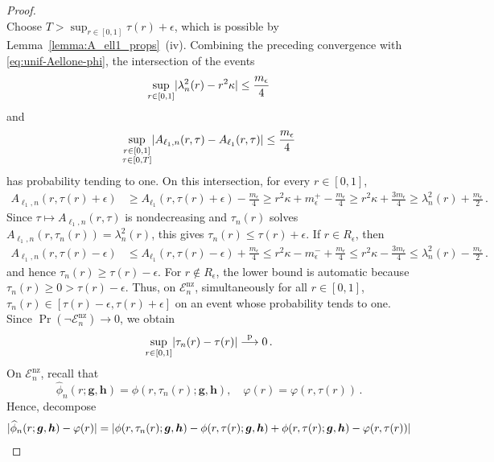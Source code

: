\documentclass{article}
\makeatletter
\theoremstyle{definition}
\newcommand{\abs}[1]{%
	\ensuremath{%
		\if@display
		\left| #1 \right|
		\else
		\lvert #1 \rvert
		\fi
	}%
}
\newcommand*{\bb}{\boldsymbol}
\def\bh{\bb{h}}
\def\bg{\bb{g}}
\makeatother
\begin{document}
\begin{bibunit}
\begin{proof}
$$$$
Choose $T>\sup_{r\in[0,1]}\tau(r)+\epsilon$, which is possible by
Lemma~\ref{lemma:A_ell1_props}~(iv). Combining the preceding convergence
with \eqref{eq:unif-Aellone-phi}, the intersection of the events
$$
\underset{r\in[0,1]}{\sup}
\abs{\lambda_n^2(r)-r^2\kappa}
\leq\frac{m_\epsilon}{4}
$$
and
$$
\underset{\substack{r\in[0,1]\\\tau\in[0,T]}}{\sup}
\abs{A_{\ell_1,n}(r,\tau)-A_{\ell_1}(r,\tau)}
\leq\frac{m_\epsilon}{4}
$$
has probability tending to one. On this intersection, for every
$r\in[0,1]$,
$$
\begin{aligned}
	    A_{\ell_1,n}(r,\tau(r)+\epsilon)
	    &\ge A_{\ell_1}(r,\tau(r)+\epsilon) - \frac{m_\epsilon}{4}
	    \ge r^2\kappa + m_\epsilon^+ - \frac{m_\epsilon}{4}
	    \ge r^2\kappa + \frac{3m_\epsilon}{4}
	    \ge \lambda_n^2(r) + \frac{m_\epsilon}{2} \,.
	\end{aligned}
	$$
	Since $\tau\mapsto A_{\ell_1,n}(r,\tau)$ is nondecreasing and
	$\tau_n(r)$ solves $A_{\ell_1,n}(r,\tau_n(r))=\lambda_n^2(r)$, this gives
	$\tau_n(r)\leq\tau(r)+\epsilon$.
If $r\in R_\epsilon$, then
$$
\begin{aligned}
	    A_{\ell_1,n}(r,\tau(r)-\epsilon)
	    &\leq A_{\ell_1}(r,\tau(r)-\epsilon) + \frac{m_\epsilon}{4}
	    \leq r^2\kappa - m_\epsilon^- + \frac{m_\epsilon}{4}
	    \leq r^2\kappa - \frac{3m_\epsilon}{4}
	    \leq \lambda_n^2(r) - \frac{m_\epsilon}{2} \,.
	\end{aligned}
	$$
	and hence $\tau_n(r)\geq\tau(r)-\epsilon$.
	For $r\notin R_\epsilon$, the lower bound is automatic because
	$\tau_n(r)\geq0>\tau(r)-\epsilon$. Thus, on
	$\mathcal E_n^{\mathrm{nz}}$, simultaneously for all
	$r\in[0,1]$, $\tau_n(r)\in[\tau(r)-\epsilon,\tau(r)+\epsilon]$ on an event
	whose probability tends to one. Since
	$\Pr(\lnot\mathcal E_n^{\mathrm{nz}})\to0$, we obtain
	\begin{equation}
	    \label{eq:unif-tau}
	    \underset{r\in[0,1]}{\sup}
	    \abs{\tau_n(r)-\tau(r)}
	    \overset{\mathrm p}{\longrightarrow}0 \,.
	\end{equation}
	On $\mathcal E_n^{\mathrm{nz}}$, recall that
	$$
	   \widehat\phi_n(r;\bg,\bh)
	   =
	   \phi(r,\tau_n(r);\bg,\bh),
	   \quad
	   \varphi(r)
	   =
	   \varphi(r,\tau(r)) \,.
	$$
	Hence, decompose
	\begin{equation}
	\label{eq:phi_varphi}
	    \begin{aligned}
			\abs{\widehat\phi_n(r;\bg,\bh) - \varphi(r)} &= \abs{\phi(r, \tau_n(r); \bg, \bh) - \phi(r, \tau(r); \bg, \bh) + \phi(r, \tau(r); \bg, \bh) - \varphi(r, \tau(r))} \\

\end{aligned}
\end{equation}
\end{proof}
\end{bibunit}
\end{document}
